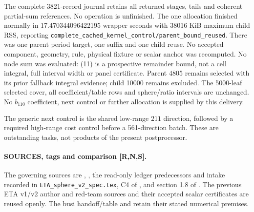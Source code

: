 \documentclass[10pt]{article}
\begin{document}
The complete 3821-record journal retains all returned stages,
tails and coherent partial-sum references. No operation is
unfinished. The one allocation finished normally in
17.470344096422195 wrapper seconds with 38016 KiB maximum
child RSS, reporting
\texttt{complete\_cached\_kernel\_control/parent\_bound\_reused}.
There was one parent period target, one suffix and one child
reuse. No accepted component, geometry, rule, physical
fixture or scalar anchor was recomputed.
No node sum was evaluated: (11) is a prospective remainder
bound, not a cell integral, full interval width or panel
certificate. Parent 4805 remains selected with its prior
fallback integral evidence; child 10000 remains excluded.
The 5000-leaf selected cover, all coefficient/table rows
and sphere/ratio intervals are unchanged. No $b_{110}$
coefficient, next control or further allocation is supplied
by this delivery.

The generic next control is the shared low-range
$211$ direction, followed by a required high-range cost control
before a 561-direction batch. These are outstanding tasks, not
products of the present postprocessor.

\paragraph{SOURCES, tags and comparison [R,N,S].}
The governing sources are
,
,
the read-only ledger predecessors and intake recorded in
\texttt{ETA\_sphere\_v2\_spec.tex}, C4 of
,
and section 1.8 of
.
The previous ETA v1/v2 author and red-team sources and their
accepted scalar certificates are reused openly.
The busi handoff/table and
retain their stated numerical premises.
\end{document}
